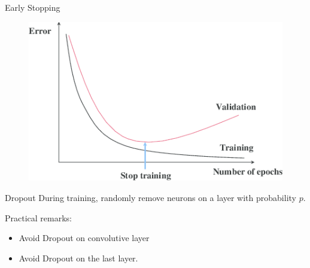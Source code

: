 \documentclass[handout]{beamer}
\begin{document}
\begin{frame}{Early Stopping}
    \begin{figure}
        \centering
        \includegraphics[width=\textwidth]{fig/L3/early_stopping.png}
    \end{figure}
\end{frame}
\begin{frame}{Dropout}
During training, randomly remove neurons on a layer with probability $p$.
 \begin{figure}
        \centering
{}       
    \end{figure}
    \pause
    \begin{alertblock}{Practical remarks:}
    \begin{itemize}
        \item Avoid Dropout on convolutive layer
        \item Avoid Dropout on the last layer.
    \end{itemize}
    \end{alertblock}
    
    \end{frame}
    
\end{document}
